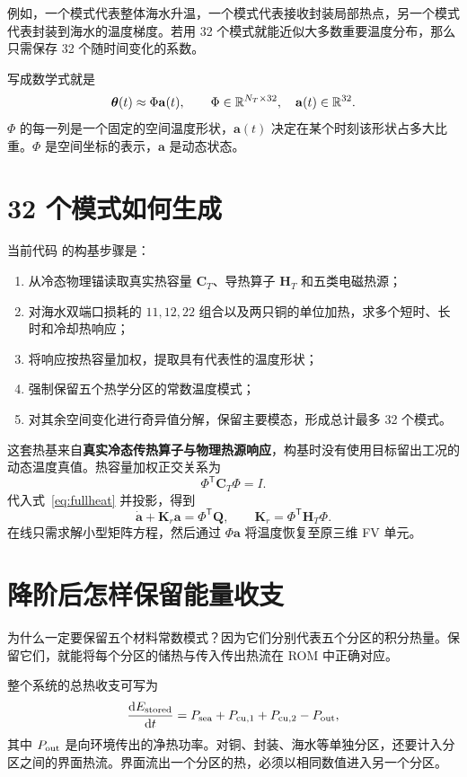例如，一个模式代表整体海水升温，一个模式代表接收封装局部热点，另一个模式代表封装到海水的温度梯度。若用 32 个模式就能近似大多数重要温度分布，那么只需保存 32 个随时间变化的系数。

写成数学式就是
\[
\boldsymbol\theta(t)\approx \Phi\mathbf a(t),\qquad
\Phi\in\mathbb R^{N_T\times 32},\quad \mathbf a(t)\in\mathbb R^{32}.
\]
$\Phi$ 的每一列是一个固定的空间温度形状，$\mathbf a(t)$ 决定在某个时刻该形状占多大比重。$\Phi$ 是空间坐标的表示，$\mathbf a$ 是动态状态。

\section{32 个模式如何生成}
当前代码  的构基步骤是：
\begin{enumerate}
\item 从冷态物理锚读取真实热容量 $\mathbf C_T$、导热算子 $\mathbf H_T$ 和五类电磁热源；
\item 对海水双端口损耗的 $11,12,22$ 组合以及两只铜的单位加热，求多个短时、长时和冷却热响应；
\item 将响应按热容量加权，提取具有代表性的温度形状；
\item 强制保留五个热学分区的常数温度模式；
\item 对其余空间变化进行奇异值分解，保留主要模态，形成总计最多 32 个模式。
\end{enumerate}

这套热基来自\textbf{真实冷态传热算子与物理热源响应}，构基时没有使用目标留出工况的动态温度真值。热容量加权正交关系为
\[
\Phi^\mathsf T\mathbf C_T\Phi=I.
\]
代入式~\eqref{eq:fullheat} 并投影，得到
\begin{equation}
\label{eq:romheat}
\dot{\mathbf a}
+\mathbf K_r\mathbf a
=\Phi^\mathsf T\mathbf Q,
\qquad
\mathbf K_r=\Phi^\mathsf T\mathbf H_T\Phi.
\end{equation}
在线只需求解小型矩阵方程，然后通过 $\Phi\mathbf a$ 将温度恢复至原三维 FV 单元。

\section{降阶后怎样保留能量收支}
为什么一定要保留五个材料常数模式？因为它们分别代表五个分区的积分热量。保留它们，就能将每个分区的储热与传入传出热流在 ROM 中正确对应。

整个系统的总热收支可写为
\[
\frac{\mathrm d E_{\rm stored}}{\mathrm d t}
=P_{\rm sea}+P_{{\rm cu},1}+P_{{\rm cu},2}
-P_{\rm out},
\]
其中 $P_{\rm out}$ 是向环境传出的净热功率。对铜、封装、海水等单独分区，还要计入分区之间的界面热流。界面流出一个分区的热，必须以相同数值进入另一个分区。

